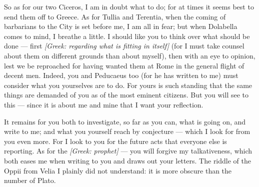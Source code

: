  So as for our two Ciceros, I am in doubt what to do; for at times it seems best to send them off to Greece. As for Tullia and Terentia, when the coming of barbarians to the City is set before me, I am all in fear; but when Dolabella comes to mind, I breathe a little. I should like you to think over what should be done --- first \textit{[Greek: regarding what is fitting in itself]} (for I must take counsel about them on different grounds than about myself), then with an eye to opinion, lest we be reproached for having wanted them at Rome in the general flight of decent men. Indeed, you and Peducaeus too (for he has written to me) must consider what you yourselves are to do. For yours is such standing that the same things are demanded of you as of the most eminent citizens. But you will see to this --- since it is about me and mine that I want your reflection.

 It remains for you both to investigate, so far as you can, what is going on, and write to me; and what you yourself reach by conjecture --- which I look for from you even more. For I look to you for the future acts that everyone else is reporting. As for the \textit{[Greek: prophet]} --- you will forgive my talkativeness, which both eases me when writing to you and draws out your letters. The riddle of the Oppii from Velia I plainly did not understand: it is more obscure than the number of Plato.
